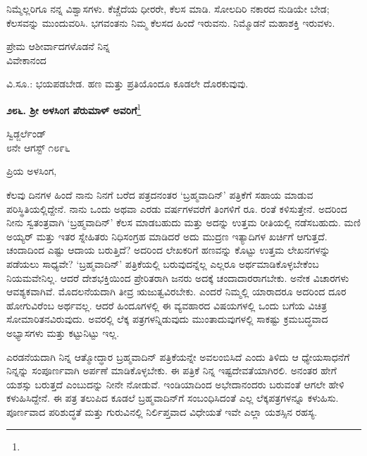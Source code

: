 ನಿಮ್ಮೆಲ್ಲರಿಗೂ ನನ್ನ ವಿಶ್ವಾಸಗಳು. ಕೆಚ್ಚೆದೆಯ ಧೀರರೇ, ಕೆಲಸ ಮಾಡಿ. ಸೋಲದಿರಿ\enginline{-} ನಕಾರದ ನುಡಿಯೇ ಬೇಡ; ಕೆಲಸವನ್ನು ಮುಂದುವರಿಸಿ. ಭಗವಂತನು ನಿಮ್ಮ ಕೆಲಸದ ಹಿಂದೆ ಇರುವನು. ನಿಮ್ಮೊಡನೆ ಮಹಾಶಕ್ತಿ ಇರುವಳು.

\begin{flushright}
ಪ್ರೇಮ ಆಶೀರ್ವಾದಗಳೊಡನೆ ನಿನ್ನ\\ವಿವೇಕಾನಂದ
\end{flushright}

ವಿ.ಸೂ.: ಭಯಪಡಬೇಡ. ಹಣ ಮತ್ತು ಪ್ರತಿಯೊಂದೂ ಕೂಡಲೇ ದೊರಕುವುವು.

\begin{center}
\textbf{೨೮೬. ಶ‍್ರೀ ಅಳಸಿಂಗ ಪೆರುಮಾಳ್ ಅವರಿಗೆ}\footnote{}
\end{center}

\begin{flushright}
ಸ್ವಿಡ್ಜರ್ಲೆಂಡ್\\೮ನೇ ಆಗಸ್ಟ್ ೧೮೯೬
\end{flushright}

\noindent
ಪ್ರಿಯ ಅಳಸಿಂಗ,

ಕೆಲವು ದಿನಗಳ ಹಿಂದೆ ನಾನು ನಿನಗೆ ಬರೆದ ಪತ್ರದನಂತರ `ಬ್ರಹ್ಮವಾದಿನ್' ಪತ್ರಿಕೆಗೆ ಸಹಾಯ ಮಾಡುವ ಪರಿಸ್ಥಿತಿಯಲ್ಲಿದ್ದೇನೆ. ನಾನು ಒಂದು ಅಥವಾ ಎರಡು ವರ್ಷಗಳವರೆಗೆ ತಿಂಗಳಿಗೆ ರೂ.  ರಂತೆ ಕಳಿಸುತ್ತೇನೆ. ಅದರಿಂದ ನೀನು ಸ್ವತಂತ್ರವಾಗಿ `ಬ್ರಹ್ಮವಾದಿನ್' ಕೆಲಸ ಮಾಡಬಹುದು ಮತ್ತು ಅದನ್ನು ಉತ್ತಮ ರೀತಿಯಲ್ಲಿ ನಡೆಸಬಹುದು. ಮಣಿ ಅಯ್ಯರ್ ಮತ್ತು ಇತರ ಸ್ನೇಹಿತರು ನಿಧಿಸಂಗ್ರಹ ಮಾಡಿದರೆ ಅದು ಮುದ್ರಣ ಇತ್ಯಾದಿಗಳ ಖರ್ಚಿಗೆ ಆಗುತ್ತದೆ. ಚಂದಾದಿಂದ ಎಷ್ಟು ಆದಾಯ ಬರುತ್ತಿದೆ? ಅದರಿಂದ ಲೇಖಕರಿಗೆ ಹಣವನ್ನು ಕೊಟ್ಟು ಉತ್ತಮ ಲೇಖನಗಳನ್ನು ಪಡೆಯಲು ಸಾಧ್ಯವೇ? `ಬ್ರಹ್ಮವಾದಿನ್' ಪತ್ರಿಕೆಯಲ್ಲಿ ಬರುವುದನ್ನೆಲ್ಲ ಎಲ್ಲರೂ ಅರ್ಥಮಾಡಿಕೊಳ್ಳಬೇಕೆಂಬ ನಿಯಮವೇನಿಲ್ಲ. ಆದರೆ ದೇಶಭಕ್ತಿಯಿಂದ ಪ್ರೇರಿತರಾಗಿ ಜನರು ಅದಕ್ಕೆ ಚಂದಾದಾರರಾಗಬೇಕು. ಅನೇಕ ವಿಚಾರಗಳು ಆವಶ್ಯಕವಾಗಿವೆ. ಮೊದಲನೆಯದಾಗಿ ತೀವ್ರ ಋಜುತ್ವವಿರಬೇಕು. ಎಂದರೆ ನಿಮ್ಮಲ್ಲಿ ಯಾರಾದರೂ ಅದರಿಂದ ದೂರ ಹೋಗುವಿರೆಂಬ ಅರ್ಥವಲ್ಲ. ಆದರೆ ಹಿಂದೂಗಳಲ್ಲಿ ಈ ವ್ಯವಹಾರದ ವಿಷಯಗಳಲ್ಲಿ ಒಂದು ಬಗೆಯ ವಿಚಿತ್ರ ಸೋಮಾರಿತನ\break ವಿರುವುದು. ಅವರಲ್ಲಿ ಲೆಕ್ಕ ಪತ್ರಗಳನ್ನಿಡುವುದು ಮುಂತಾದುವುಗಳಲ್ಲಿ ಸಾಕಷ್ಟು ಕ್ರಮಬದ್ಧವಾದ ಅಭ್ಯಾಸಗಳು ಮತ್ತು ಕಟ್ಟುನಿಟ್ಟು ಇಲ್ಲ.

\vspace{0.1cm}

ಎರಡನೆಯದಾಗಿ ನಿನ್ನ ಆತ್ಮೋದ್ಧಾರ ಬ್ರಹ್ಮವಾದಿನ್ ಪತ್ರಿಕೆಯನ್ನೇ ಅವಲಂಬಿಸಿದೆ ಎಂದು ತಿಳಿದು ಆ ಧ್ಯೇಯಸಾಧನೆಗೆ ನಿನ್ನನ್ನು ಸಂಪೂರ್ಣವಾಗಿ ಅರ್ಪಣೆ ಮಾಡಿಕೊಳ್ಳಬೇಕು. ಈ ಪತ್ರಿಕೆ ನಿನ್ನ ಇಷ್ಟದೇವತೆಯಾಗಿರಲಿ. ಅನಂತರ ಹೇಗೆ ಯಶಸ್ಸು ಬರುತ್ತದೆ ಎಂಬುದನ್ನು ನೀನೇ ನೋಡುವೆ. ಇಂಡಿಯಾದಿಂದ ಅಭೇದಾನಂದರು ಬರುವಂತೆ ಆಗಲೇ ಹೇಳಿ ಕಳುಹಿಸಿದ್ದೇನೆ. ಈ ಪತ್ರ ತಲುಪಿದ ಕೂಡಲೆ ಬ್ರಹ್ಮವಾದಿನ್‌ಗೆ ಸಂಬಂಧಿಸಿದಂತೆ ಎಲ್ಲ ಲೆಕ್ಕಪತ್ರಗಳನ್ನೂ ಕಳುಹಿಸು. ಪೂರ್ಣವಾದ ಪರಿಶುದ್ಧತೆ ಮತ್ತು ಗುರುವಿನಲ್ಲಿ ನಿರ್ಲಿಪ್ತವಾದ ವಿಧೇಯತೆ ಇವೇ ಎಲ್ಲಾ ಯಶಸ್ಸಿನ ರಹಸ್ಯ.

\vspace{0.1cm}

